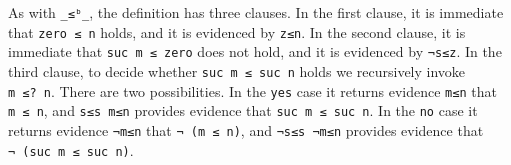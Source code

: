 \begin{fence}
\begin{code}%
\>[0]\AgdaSpace{}%
\AgdaSymbol{:}\AgdaSpace{}%
\AgdaSpace{}%
\AgdaSymbol{(}\AgdaSpace{}%
\AgdaSpace{}%
\AgdaSymbol{:}\AgdaSpace{}%
\AgdaSymbol{)}\AgdaSpace{}%
\AgdaSpace{}%
\AgdaSpace{}%
\AgdaSymbol{(}\AgdaSpace{}%
\AgdaSpace{}%
\AgdaSymbol{)}\<%
\\
\>[0]%
\>[6]\AgdaSpace{}%
%
\>[29]\AgdaSymbol{=}%
\>[32]\AgdaSpace{}%
\<%
\\
\>[0]\AgdaSpace{}%
\AgdaSpace{}%
\AgdaSpace{}%
%
\>[29]\AgdaSymbol{=}%
\>[32]\AgdaSpace{}%
\<%
\\
\>[0]\AgdaSpace{}%
\AgdaSpace{}%
\AgdaSpace{}%
\AgdaSpace{}%
\AgdaSpace{}%
\AgdaSpace{}%
\AgdaSpace{}%
\AgdaSpace{}%
\<%
\\
\>[0]%
\>[18]\AgdaSymbol{|}\AgdaSpace{}%
\AgdaSpace{}%
%
\>[29]\AgdaSymbol{=}%
\>[32]\AgdaSpace{}%
\AgdaSymbol{(}\AgdaSpace{}%
\AgdaSymbol{)}\<%
\\
\>[0]%
\>[18]\AgdaSymbol{|}\AgdaSpace{}%
\AgdaSpace{}%
%
\>[29]\AgdaSymbol{=}%
\>[32]\AgdaSpace{}%
\AgdaSymbol{(}\AgdaSpace{}%
\AgdaSymbol{)}\<%
\end{code}
\end{fence}

As with \texttt{\_≤ᵇ\_}, the definition has three clauses. In the first
clause, it is immediate that \texttt{zero\ ≤\ n} holds, and it is
evidenced by \texttt{z≤n}. In the second clause, it is immediate that
\texttt{suc\ m\ ≤\ zero} does not hold, and it is evidenced by
\texttt{¬s≤z}. In the third clause, to decide whether
\texttt{suc\ m\ ≤\ suc\ n} holds we recursively invoke
\texttt{m\ ≤?\ n}. There are two possibilities. In the \texttt{yes} case
it returns evidence \texttt{m≤n} that \texttt{m\ ≤\ n}, and
\texttt{s≤s\ m≤n} provides evidence that \texttt{suc\ m\ ≤\ suc\ n}. In
the \texttt{no} case it returns evidence \texttt{¬m≤n} that
\texttt{¬\ (m\ ≤\ n)}, and \texttt{¬s≤s\ ¬m≤n} provides evidence that
\texttt{¬\ (suc\ m\ ≤\ suc\ n)}.

